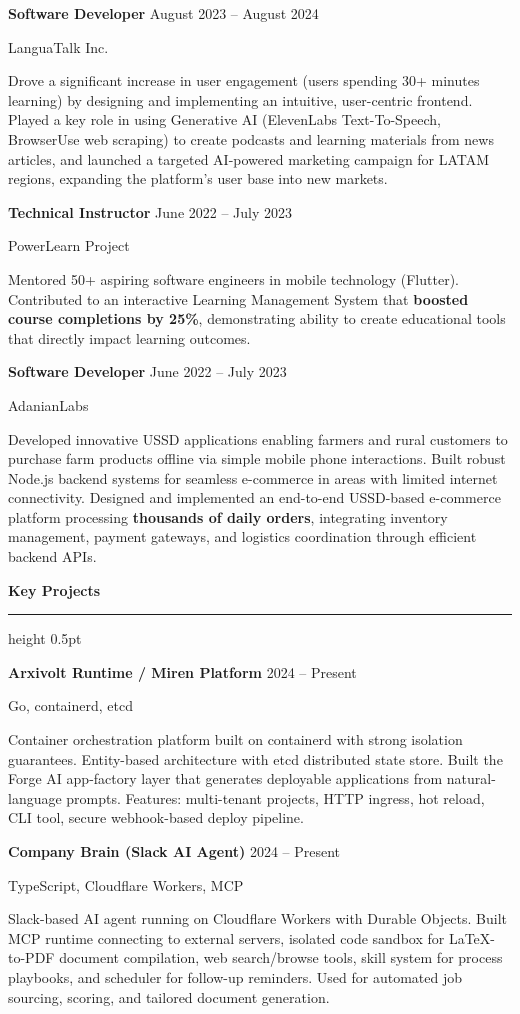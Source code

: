 \documentclass[10pt,a4paper]{article}
\newcommand{\cvsection}[1]{%
    \par\vspace{8pt}%
    {\color{headingcolor}\Large\bfseries #1}\par
    \vspace{2pt}%
    {\color{rulecolor}\hrule height 0.5pt}%
    \vspace{4pt}%
}
\newcommand{\entry}[4]{%
    \par\vspace{4pt}
    {\textbf{#1} \hfill #2}\par
    {\small #3 \hfill #4}\par
    \vspace{2pt}
}
\begin{document}
\vspace{4pt}

\entry{Software Developer}{August 2023 -- August 2024}{LanguaTalk Inc.}{}
Drove a significant increase in user engagement (users spending 30+ minutes learning) by designing and implementing an intuitive, user-centric frontend. Played a key role in using Generative AI (ElevenLabs Text-To-Speech, BrowserUse web scraping) to create podcasts and learning materials from news articles, and launched a targeted AI-powered marketing campaign for LATAM regions, expanding the platform's user base into new markets.

\vspace{4pt}

\entry{Technical Instructor}{June 2022 -- July 2023}{PowerLearn Project}{}
Mentored 50+ aspiring software engineers in mobile technology (Flutter). Contributed to an interactive Learning Management System that \textbf{boosted course completions by 25\%}, demonstrating ability to create educational tools that directly impact learning outcomes.

\vspace{4pt}

\entry{Software Developer}{June 2022 -- July 2023}{AdanianLabs}{}
Developed innovative USSD applications enabling farmers and rural customers to purchase farm products offline via simple mobile phone interactions. Built robust Node.js backend systems for seamless e-commerce in areas with limited internet connectivity. Designed and implemented an end-to-end USSD-based e-commerce platform processing \textbf{thousands of daily orders}, integrating inventory management, payment gateways, and logistics coordination through efficient backend APIs.

\cvsection{Key Projects}

\entry{Arxivolt Runtime / Miren Platform}{2024 -- Present}{Go, containerd, etcd}{}
Container orchestration platform built on containerd with strong isolation guarantees. Entity-based architecture with etcd distributed state store. Built the Forge AI app-factory layer that generates deployable applications from natural-language prompts. Features: multi-tenant projects, HTTP ingress, hot reload, CLI tool, secure webhook-based deploy pipeline.

\vspace{4pt}

\entry{Company Brain (Slack AI Agent)}{2024 -- Present}{TypeScript, Cloudflare Workers, MCP}{}
Slack-based AI agent running on Cloudflare Workers with Durable Objects. Built MCP runtime connecting to external servers, isolated code sandbox for LaTeX-to-PDF document compilation, web search/browse tools, skill system for process playbooks, and scheduler for follow-up reminders. Used for automated job sourcing, scoring, and tailored document generation.
\end{document}
